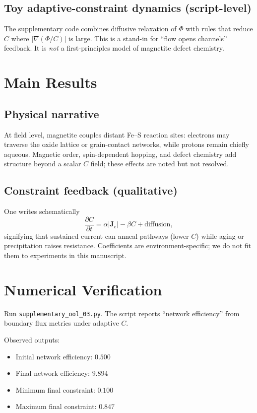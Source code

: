 \documentclass[11pt,a4paper]{article}
\begin{document}
\subsection{Toy adaptive-constraint dynamics (script-level)}
The supplementary code combines diffusive relaxation of $\Phi$ with rules that reduce $C$ where $|\nabla(\Phi/C)|$ is large. This is a stand-in for ``flow opens channels'' feedback. It is \emph{not} a first-principles model of magnetite defect chemistry.

\section{Main Results}

\subsection{Physical narrative}
At field level, magnetite couples distant Fe--S reaction sites: electrons may traverse the oxide lattice or grain-contact networks, while protons remain chiefly aqueous. Magnetic order, spin-dependent hopping, and defect chemistry add structure beyond a scalar $C$ field; these effects are noted but not resolved.

\subsection{Constraint feedback (qualitative)}
One writes schematically
\begin{equation}
\frac{\partial C}{\partial t} = \alpha |\bm{J}_e| - \beta C + \text{diffusion},
\end{equation}
signifying that sustained current can anneal pathways (lower $C$) while aging or precipitation raises resistance. Coefficients are environment-specific; we do not fit them to experiments in this manuscript.

\section{Numerical Verification}
Run \texttt{supplementary\_ool\_03.py}. The script reports ``network efficiency'' from boundary flux metrics under adaptive $C$.

Observed outputs:
\begin{itemize}
\item Initial network efficiency: $0.500$
\item Final network efficiency: $9.894$
\item Minimum final constraint: $0.100$
\item Maximum final constraint: $0.847$
\end{itemize}
\end{document}
